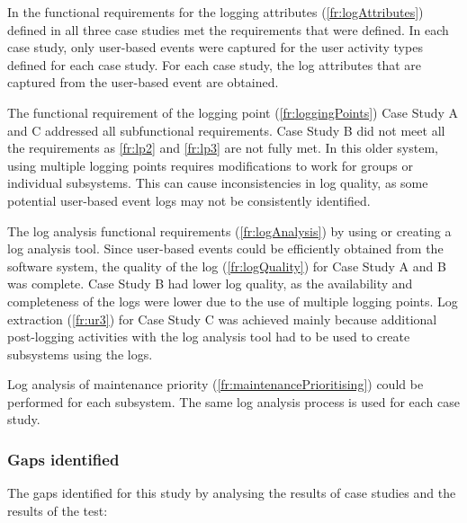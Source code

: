 In  the functional requirements for the logging attributes (\ref{fr:logAttributes}) defined in  all three case studies met the requirements that were defined. In each case study, only user-based events were captured for the user activity types defined for each case study. For each case study, the log attributes that are captured from the user-based event are obtained.\par The functional requirement of the logging point (\ref{fr:loggingPoints}) Case Study A and C addressed all subfunctional requirements. Case Study B did not meet all the requirements as \ref{fr:lp2} and \ref{fr:lp3} are not fully met. In this older system, using multiple logging points requires modifications to work for groups or individual subsystems. This can cause inconsistencies in log quality, as some potential user-based event logs may not be consistently identified.\par The log analysis functional requirements (\ref{fr:logAnalysis}) by using or creating a log analysis tool. Since user-based events could be efficiently obtained from the software system, the quality of the log (\ref{fr:logQuality}) for Case Study A and B was complete. Case Study B had lower log quality, as the availability and completeness of the logs were lower due to the use of multiple logging points. Log extraction (\ref{fr:ur3}) for Case Study C was achieved mainly because additional post-logging activities with the log analysis tool had to be used to create subsystems using the logs.\par Log analysis of maintenance priority (\ref{fr:maintenancePrioritising}) could be performed for each subsystem. The same log analysis process is used for each case study.

\subsubsection{Gaps identified}
The gaps identified for this study by analysing the results of case studies and the results of the test:

